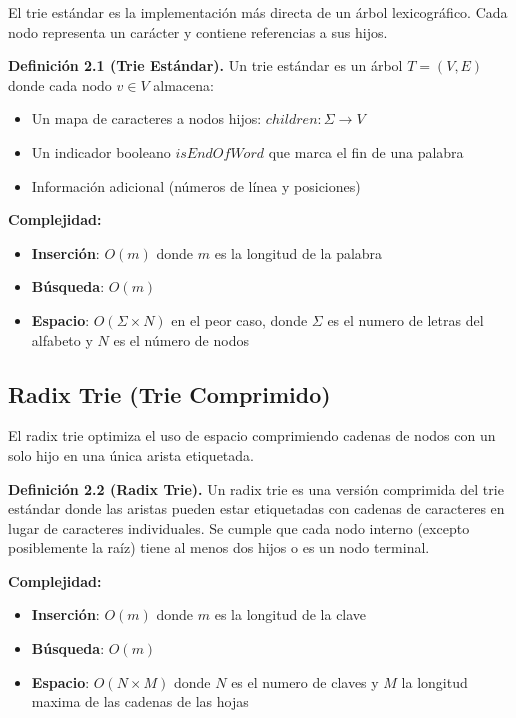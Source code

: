 \documentclass[11pt,a4paper]{article}
\begin{document}
El trie estándar es la implementación más directa de un árbol lexicográfico. Cada nodo representa un carácter y contiene referencias a sus hijos.

\textbf{Definición 2.1 (Trie Estándar).} Un trie estándar es un árbol $T = (V, E)$ donde cada nodo $v \in V$ almacena:
\begin{itemize}
    \item Un mapa de caracteres a nodos hijos: $children : \Sigma \rightarrow V$
    \item Un indicador booleano $isEndOfWord$ que marca el fin de una palabra
    \item Información adicional (números de línea y posiciones)
\end{itemize}

\textbf{Complejidad:}
\begin{itemize}
    \item \textbf{Inserción}: $O(m)$ donde $m$ es la longitud de la palabra
    \item \textbf{Búsqueda}: $O(m)$
    \item \textbf{Espacio}: $O(\Sigma \times N)$ en el peor caso, donde $\Sigma$ es el numero de letras del alfabeto y $N$ es el número de nodos
\end{itemize}

\subsection{Radix Trie (Trie Comprimido)}

El radix trie optimiza el uso de espacio comprimiendo cadenas de nodos con un solo hijo en una única arista etiquetada.

\textbf{Definición 2.2 (Radix Trie).} Un radix trie es una versión comprimida del trie estándar donde las aristas pueden estar etiquetadas con cadenas de caracteres en lugar de caracteres individuales. Se cumple que cada nodo interno (excepto posiblemente la raíz) tiene al menos dos hijos o es un nodo terminal.

\textbf{Complejidad:}
\begin{itemize}
    \item \textbf{Inserción}: $O(m)$ donde $m$ es la longitud de la clave
    \item \textbf{Búsqueda}: $O(m)$
    \item \textbf{Espacio}: $O(N \times M)$ donde $N$ es el numero de claves y $M$ la longitud maxima de las cadenas de las hojas
\end{itemize}
\end{document}
